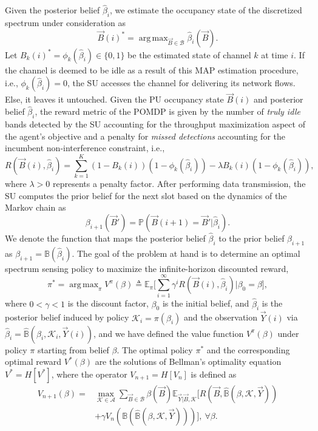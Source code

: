 \documentclass[10pt,twocolumn]{IEEEtran}
\DeclareMathOperator*{\argmax}{arg\,max}
\begin{document}
Given the posterior belief $\hat{\beta}_i$, we estimate the occupancy state of the discretized spectrum under consideration as
\begin{equation}
    \vec{B}(i)^{*} = \argmax_{\vec{B} {\in} \mathcal{B}} \hat{\beta}_{i}(\vec{B}).
\end{equation}
Let $B_{k}(i)^{*} = \phi_{k}(\hat{\beta}_{i}) {\in} \{0, 1\}$ be the estimated state of channel $k$ at time $i$. If the channel is deemed to be idle as a result of this MAP estimation procedure, i.e., $\phi_{k}(\hat{\beta}_{i}) = 0$, the SU accesses the channel for delivering its network flows. Else, it leaves it untouched. Given the PU occupancy state $\vec{B}(i)$ and posterior belief $\hat\beta_i$, the reward metric of the POMDP is given by the number of \emph{truly idle} bands detected by the SU accounting for the throughput maximization aspect of the agent's objective and a penalty for \emph{missed detections} accounting for the incumbent non-interference constraint, i.e.,
\begin{equation}
\nonumber
    R(\vec{B}(i), \hat{\beta}_i){=}\sum_{k=1}^{K} (1{-}B_k(i))(1{-}\phi_k(\hat{\beta}_{i})){-}\lambda B_k(i)(1 - \phi_k(\hat{\beta}_i)),
\end{equation}
where $\lambda{>}0$ represents a penalty factor. After performing data transmission, the SU computes the prior belief for the next slot based on the dynamics of the Markov chain as
\begin{equation}\label{13}
    \beta_{i+1}(\vec{B}') = \mathbb{P}(\vec{B}(i+1) = \vec{B}'|\hat{\beta}_{i}).
\end{equation}
We denote the function that maps the posterior belief $\hat\beta_i$ to the prior belief $\beta_{i+1}$ as $\beta_{i+1}={\mathbb B}(\hat\beta_i)$.
The goal of the problem at hand is to determine an optimal spectrum sensing policy to maximize the infinite-horizon discounted reward,
\begin{equation}\label{14}
    \pi^{*}{=}\argmax_{\pi} V^{\pi}(\beta) \triangleq \mathbb{E}_{\pi} \Big[\sum_{i=1}^{\infty} \gamma^{i} R(\vec{B}(i), \hat{\beta}_i)|\beta_0 {=}\beta\Big],
\end{equation}
where $0{<}\gamma{<}1$ is the discount factor, $\beta_0$ is the initial belief, and $\hat\beta_i$ is the posterior belief induced by policy $\mathcal K_i{=}\pi(\beta_i)$ and the observation $\vec{Y}(i)$ via $\hat\beta_i{=}\hat{\mathbb B}(\beta_i, \mathcal K_i, \vec{Y}(i))$, and we have defined the value function $V^{\pi}(\beta)$ under policy $\pi$ starting from belief $\beta$.
The optimal policy $\pi^*$ and the corresponding optimal reward $V^*(\beta)$ are the solutions of Bellman's optimality equation $V^*{=}H[V^*]$, where the operator $V_{n+1}{=}H[V_n]$ is defined as
\begin{align}\label{16}
\nonumber
        V_{n+1}(\beta) = &\max_{\mathcal{K} {\in} \mathcal{A}} \sum_{\vec{B} {\in} \mathcal{B}} \beta(\vec{B}) \mathbb{E}_{\vec{Y}|\vec{B}, \mathcal{K}} \Big[R(\vec{B}, \hat{\mathbb{B}}(\beta, \mathcal{K}, \vec{Y}))\\ &+\gamma V_n(\mathbb{B}(\hat{\mathbb{B}}(\beta, \mathcal{K}, \vec{Y})))\Big],\ \forall \beta.
\end{align}
\end{document}
